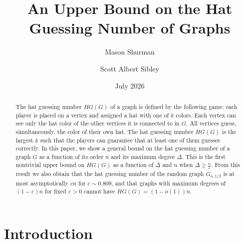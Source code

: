 \documentclass{amsart}
\title{An Upper Bound on the Hat Guessing Number of Graphs}
\author{Mason Shurman}
\author{Scott Albert Sibley}
\date{July 2026}
\newcommand{\1}{\mathds{1}}
\numberwithin{theorem}{section}
\def\cS{\ensuremath{\mathcal{S}}}
\newcommand{\darkBlue}[1]{{\color{DarkBlue}{#1}}}
\newcommand{\mason}[1]{\darkBlue{\bf [Mason: #1]}}
\begin{document}
\maketitle
\begin{abstract}
     The hat guessing number $HG(G)$ of a graph is defined by the following game: each player is placed on a vertex and assigned a hat with one of $k$ colors. Each vertex can see only the hat color of the other vertices it is connected to in $G$. All vertices guess, simultaneously, the color of their own hat. %
     The hat guessing number $HG(G)$ is the largest $k$ such that the players can guarantee that at least one of them guesses correctly. %
     In this paper, we show a general bound on the hat guessing number of a graph $G$ as a function of its order $n$ and its maximum degree $\Delta$. This is the first nontrivial upper bound on $HG(G)$ as a function of $\Delta$ and $n$ when $\Delta \geq \frac{n}{e}$. From this result we also obtain that the hat guessing number of the random graph $G_{n,1/2}$ is at most asymptotically $cn$ for $c\sim 0.809$, and that graphs with maximum degrees of $ (1-\varepsilon )n$ for fixed $\varepsilon>0$ cannot have $HG(G)=(1-o(1))n$.
     
\end{abstract}

\section{Introduction}
\end{document}
